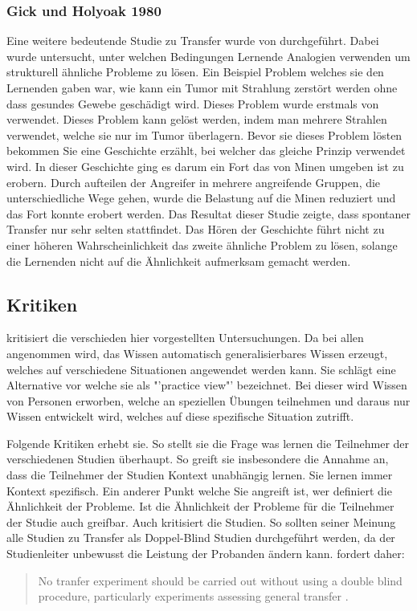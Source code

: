 \subsubsection{Gick und Holyoak 1980}

Eine weitere bedeutende Studie zu Transfer wurde von \citet{Gick1980} durchgeführt. Dabei wurde untersucht, unter welchen Bedingungen Lernende Analogien verwenden um strukturell ähnliche Probleme zu lösen. Ein Beispiel Problem welches sie den Lernenden gaben war, wie kann ein Tumor mit Strahlung zerstört werden ohne dass gesundes Gewebe geschädigt wird. Dieses Problem wurde erstmals von \citet{Duncker1945} verwendet. Dieses Problem kann gelöst werden, indem man mehrere Strahlen verwendet, welche sie nur im Tumor überlagern. Bevor sie dieses Problem lösten bekommen Sie eine Geschichte erzählt, bei welcher das gleiche Prinzip verwendet wird. In dieser Geschichte ging es darum ein Fort das von Minen umgeben ist zu erobern. Durch aufteilen der Angreifer in mehrere angreifende Gruppen, die unterschiedliche Wege gehen, wurde die Belastung auf die Minen reduziert und das Fort konnte erobert werden. Das Resultat dieser Studie zeigte, dass spontaner Transfer nur sehr selten stattfindet. Das Hören der Geschichte führt nicht zu einer höheren Wahrscheinlichkeit das zweite ähnliche Problem zu lösen, solange die Lernenden nicht auf die Ähnlichkeit aufmerksam gemacht werden.

\subsection{Kritiken}

\citet{Lave1988} kritisiert die verschieden hier vorgestellten Untersuchungen. Da bei allen angenommen wird, das  Wissen automatisch generalisierbares Wissen erzeugt, welches auf verschiedene Situationen angewendet werden kann. Sie schlägt eine Alternative vor welche sie als "'practice view"' bezeichnet. Bei dieser wird Wissen von Personen erworben, welche an speziellen Übungen teilnehmen und daraus nur Wissen entwickelt wird, welches auf diese spezifische Situation zutrifft.

Folgende Kritiken erhebt sie. So stellt sie die Frage was lernen die Teilnehmer der verschiedenen Studien überhaupt. So greift sie insbesondere die Annahme an, dass die Teilnehmer der Studien Kontext unabhängig lernen. Sie lernen immer Kontext spezifisch. Ein anderer Punkt welche Sie angreift ist, wer definiert die Ähnlichkeit der Probleme. Ist die Ähnlichkeit der Probleme für die Teilnehmer der Studie auch greifbar. Auch \citet{Detterman1993} kritisiert die Studien. So sollten seiner Meinung alle Studien zu Transfer als Doppel-Blind Studien durchgeführt werden, da der Studienleiter unbewusst die Leistung der Probanden ändern kann. \citeauthor{Detterman1993} fordert daher:
\begin{quote}
No tranfer experiment should be carried out without using a double blind procedure, particularly experiments assessing general transfer \citet[S. 10]{Detterman1993}.
\end{quote}





